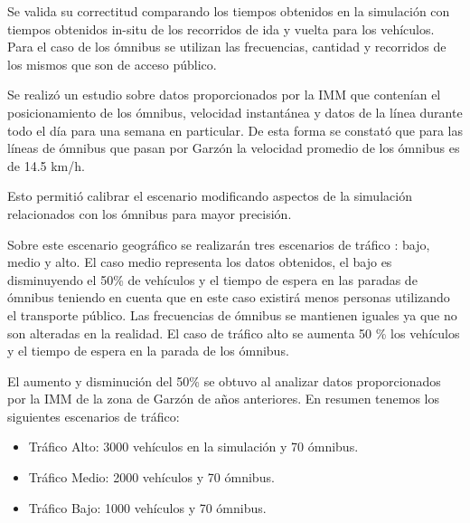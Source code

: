 Se valida su correctitud comparando los tiempos obtenidos en la simulación con tiempos obtenidos in-situ de los recorridos de ida y vuelta para los vehículos. Para el caso de los ómnibus se utilizan las frecuencias, cantidad y recorridos de los mismos que son de acceso público.

Se realizó un estudio sobre datos proporcionados por la IMM que contenían el posicionamiento de los ómnibus, velocidad instantánea y datos de la línea durante todo el día para una semana en particular. De esta forma se constató que para las líneas de ómnibus que pasan por Garzón la velocidad promedio de los ómnibus es de 14.5 km/h.

Esto permitió calibrar el escenario modificando aspectos de la simulación relacionados con los ómnibus para mayor precisión.

Sobre este escenario geográfico se realizarán tres escenarios de tráfico : bajo, medio y alto.
El caso medio representa los datos obtenidos, el bajo es disminuyendo el 50\% de vehículos y el tiempo de espera en las paradas de ómnibus teniendo en cuenta que en este caso existirá menos personas utilizando el transporte público. Las frecuencias de ómnibus se mantienen iguales ya que no son alteradas en la realidad.
El caso de tráfico alto se aumenta 50 \%  los vehículos y el tiempo de espera en la parada de los ómnibus.

El aumento y disminución del 50\% se obtuvo al analizar datos proporcionados por la IMM de la zona de Garzón de años anteriores. \newline
En resumen tenemos los siguientes escenarios de tráfico:

\begin{itemize}
\item Tráfico Alto:  3000 vehículos en la simulación y 70 ómnibus. 
\item Tráfico Medio: 2000 vehículos y 70 ómnibus.
\item Tráfico Bajo:  1000 vehículos y 70 ómnibus.
\end{itemize}

 




